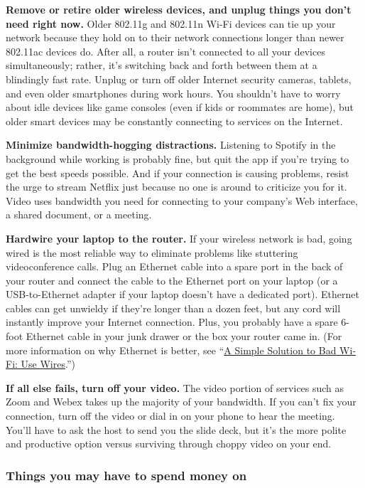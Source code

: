 \textbf{Remove or retire older wireless devices, and unplug things you
don't need right now.} Older 802.11g and 802.11n Wi-Fi devices can tie
up your network because they hold on to their network connections longer
than newer 802.11ac devices do. After all, a router isn't connected to
all your devices simultaneously; rather, it's switching back and forth
between them at a blindingly fast rate. Unplug or turn off older
Internet security cameras, tablets, and even older smartphones during
work hours. You shouldn't have to worry about idle devices like game
consoles (even if kids or roommates are home), but older smart devices
may be constantly connecting to services on the Internet.

\textbf{Minimize bandwidth-hogging distractions.} Listening to Spotify
in the background while working is probably fine, but quit the app if
you're trying to get the best speeds possible. And if your connection is
causing problems, resist the urge to stream Netflix just because no one
is around to criticize you for it. Video uses bandwidth you need for
connecting to your company's Web interface, a shared document, or a
meeting.

\textbf{Hardwire your laptop to the router.} If your wireless network is
bad, going wired is the most reliable way to eliminate problems like
stuttering videoconference calls. Plug an Ethernet cable into a spare
port in the back of your router and connect the cable to the Ethernet
port on your laptop (or a USB-to-Ethernet adapter if your laptop doesn't
have a dedicated port). Ethernet cables can get unwieldy if they're
longer than a dozen feet, but any cord will instantly improve your
Internet connection. Plus, you probably have a spare 6-foot Ethernet
cable in your junk drawer or the box your router came in. (For more
information on why Ethernet is better, see
``\href{https://www.nytimes.com/wirecutter/blog/bad-wifi-solutions/}{A
Simple Solution to Bad Wi-Fi: Use Wires}.'')

\textbf{If all else fails, turn off your video.} The video portion of
services such as Zoom and Webex takes up the majority of your bandwidth.
If you can't fix your connection, turn off the video or dial in on your
phone to hear the meeting. You'll have to ask the host to send you the
slide deck, but it's the more polite and productive option versus
surviving through choppy video on your end.

\hypertarget{things-you-may-have-to-spend-money-on}{%
\subsubsection{Things you may have to spend money
on}\label{things-you-may-have-to-spend-money-on}}

